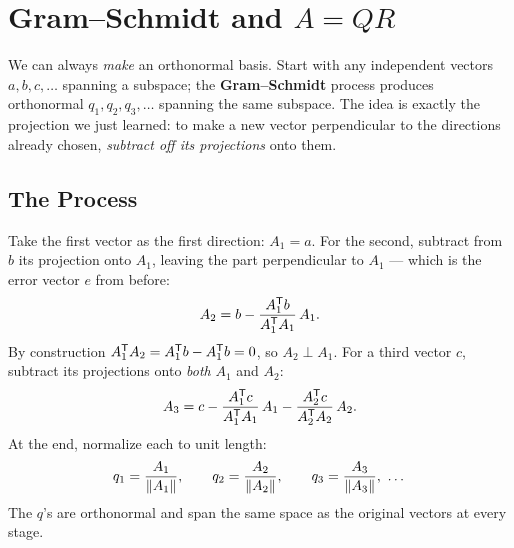 
\section{Gram--Schmidt and \texorpdfstring{$A=QR$}{A=QR}}

We can always \emph{make} an orthonormal basis. Start with any independent vectors $a,b,c,\dots$ spanning a subspace; the \textbf{Gram--Schmidt} process produces orthonormal $q_1,q_2,q_3,\dots$ spanning the same subspace. The idea is exactly the projection we just learned: to make a new vector perpendicular to the directions already chosen, \emph{subtract off its projections} onto them.

\subsection{The Process}

Take the first vector as the first direction: $A_1 = a$. For the second, subtract from $b$ its projection onto $A_1$, leaving the part perpendicular to $A_1$ --- which is the error vector $e$ from before:
\[
   A_2 = b - \frac{A_1^{\mathsf T} b}{A_1^{\mathsf T} A_1}\,A_1 .
\]
By construction $A_1^{\mathsf T} A_2 = A_1^{\mathsf T} b - A_1^{\mathsf T} b = 0$, so $A_2\perp A_1$. For a third vector $c$, subtract its projections onto \emph{both} $A_1$ and $A_2$:
\[
   A_3 = c - \frac{A_1^{\mathsf T} c}{A_1^{\mathsf T} A_1}\,A_1 - \frac{A_2^{\mathsf T} c}{A_2^{\mathsf T} A_2}\,A_2 .
\]
At the end, normalize each to unit length:
\[
   q_1 = \frac{A_1}{\left\|A_1\right\|},\qquad q_2 = \frac{A_2}{\left\|A_2\right\|},\qquad q_3 = \frac{A_3}{\left\|A_3\right\|},\ \dots
\]
The $q$'s are orthonormal and span the same space as the original vectors at every stage.

